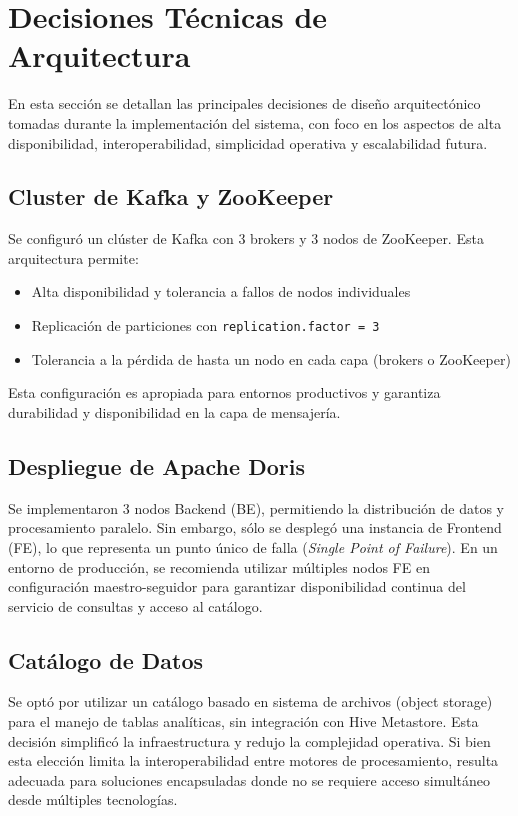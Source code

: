 \section{Decisiones Técnicas de Arquitectura}

En esta sección se detallan las principales decisiones de diseño arquitectónico tomadas durante la implementación del sistema,
 con foco en los aspectos de alta disponibilidad, interoperabilidad, simplicidad operativa y escalabilidad futura.

\subsection{Cluster de Kafka y ZooKeeper}
Se configuró un clúster de Kafka con 3 brokers y 3 nodos de ZooKeeper. Esta arquitectura permite:
\begin{itemize}
    \item Alta disponibilidad y tolerancia a fallos de nodos individuales
    \item Replicación de particiones con \texttt{replication.factor = 3}
    \item Tolerancia a la pérdida de hasta un nodo en cada capa (brokers o ZooKeeper)
\end{itemize}
Esta configuración es apropiada para entornos productivos y garantiza durabilidad y disponibilidad en la capa de mensajería.

\subsection{Despliegue de Apache Doris}
Se implementaron 3 nodos Backend (BE), permitiendo la distribución de datos y procesamiento paralelo. 
Sin embargo, sólo se desplegó una instancia de Frontend (FE), lo que representa un punto único de falla (\textit{Single Point of Failure}). 
En un entorno de producción, se recomienda utilizar múltiples nodos FE en configuración maestro-seguidor para garantizar disponibilidad continua del servicio de consultas y acceso al catálogo.

\subsection{Catálogo de Datos}
Se optó por utilizar un catálogo basado en sistema de archivos (object storage) para el manejo de tablas analíticas, sin integración con Hive Metastore. 
Esta decisión simplificó la infraestructura y redujo la complejidad operativa. Si bien esta elección limita la interoperabilidad entre motores de procesamiento, 
resulta adecuada para soluciones encapsuladas donde no se requiere acceso simultáneo desde múltiples tecnologías.

